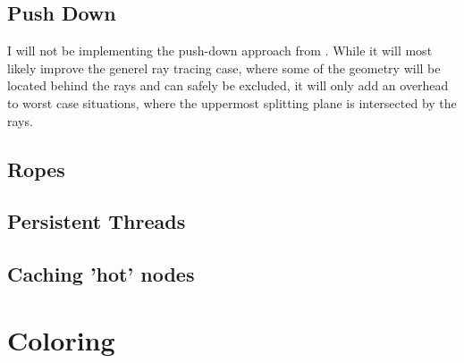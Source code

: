 \subsection{Push Down}

I will not be implementing the push-down approach from
. While it will most likely improve the generel ray
tracing case, where some of the geometry will be located behind the
rays and can safely be excluded, it will only add an overhead to worst
case situations, where the uppermost splitting plane is intersected by
the rays.

\subsection{Ropes}


\subsection{Persistent Threads}


\subsection{Caching 'hot' nodes}





\section{Coloring}

